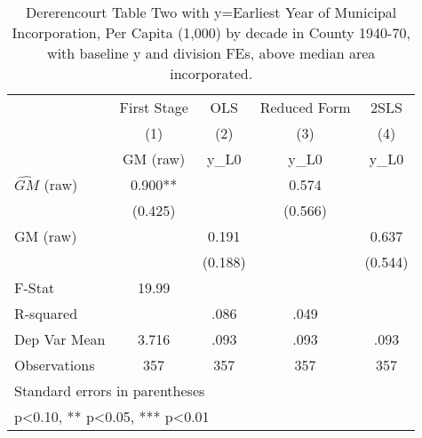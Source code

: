 \begin{table}[htbp]\centering
\def\sym#1{\ifmmode^{#1}\else\(^{#1}\)\fi}
\caption{Dererencourt Table Two with y=Earliest Year of Municipal Incorporation, Per Capita (1,000) by decade in County 1940-70, with baseline y and division FEs, above median area incorporated.}
\begin{tabular}{l*{4}{c}}
\toprule
                    & First Stage   &         OLS   &Reduced Form   &        2SLS   \\
                    &\multicolumn{1}{c}{(1)}&\multicolumn{1}{c}{(2)}&\multicolumn{1}{c}{(3)}&\multicolumn{1}{c}{(4)}\\
                    &\multicolumn{1}{c}{GM  (raw)}&\multicolumn{1}{c}{y\_L0}&\multicolumn{1}{c}{y\_L0}&\multicolumn{1}{c}{y\_L0}\\
\midrule
$\hat{GM}$ (raw)    &       0.900** &               &       0.574   &               \\
                    &     (0.425)   &               &     (0.566)   &               \\
\addlinespace
GM  (raw)           &               &       0.191   &               &       0.637   \\
                    &               &     (0.188)   &               &     (0.544)   \\
\midrule
F-Stat              &       19.99   &               &               &               \\
R-squared           &               &        .086   &        .049   &               \\
Dep Var Mean        &       3.716   &        .093   &        .093   &        .093   \\
Observations        &         357   &         357   &         357   &         357   \\
\bottomrule
\multicolumn{5}{l}{\footnotesize Standard errors in parentheses}\\
\multicolumn{5}{l}{\footnotesize * p<0.10, ** p<0.05, *** p<0.01}\\
\end{tabular}
\end{table}

